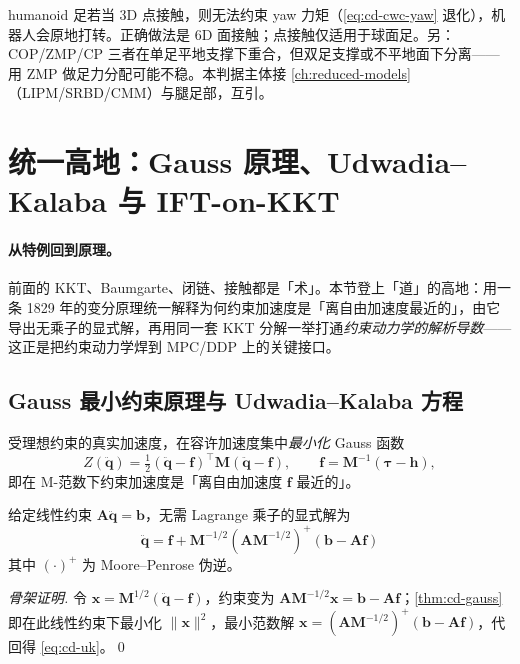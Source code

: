 \begin{pitfall}
humanoid 足若当 3D 点接触，则无法约束 yaw 力矩（\cref{eq:cd-cwc-yaw} 退化），机器人会原地打转。正确做法是 6D 面接触；点接触仅适用于球面足。另：COP/ZMP/CP 三者在单足平地支撑下重合，但双足支撑或不平地面下分离——用 ZMP 做足力分配可能不稳。本判据主体接 \cref{ch:reduced-models}（LIPM/SRBD/CMM）与腿足部，互引。
\end{pitfall}

\section{统一高地：Gauss 原理、Udwadia--Kalaba 与 IFT-on-KKT}
\label{sec:cd-gauss}

\paragraph{从特例回到原理。}
前面的 KKT、Baumgarte、闭链、接触都是「术」。本节登上「道」的高地：用一条 1829 年的变分原理统一解释为何约束加速度是「离自由加速度最近的」，由它导出无乘子的显式解，再用同一套 KKT 分解一举打通\emph{约束动力学的解析导数}——这正是把约束动力学焊到 MPC/DDP 上的关键接口。

\subsection{Gauss 最小约束原理与 Udwadia--Kalaba 方程}
\begin{theorem}\label{thm:cd-gauss}
受理想约束的真实加速度，在容许加速度集中\emph{最小化} Gauss 函数
\begin{equation}
  Z(\ddot{\mathbf q})=\tfrac12(\ddot{\mathbf q}-\mathbf f)^\top\mathbf M(\ddot{\mathbf q}-\mathbf f),\qquad \mathbf f=\mathbf M^{-1}(\boldsymbol\tau-\mathbf h),
  \label{eq:cd-gauss}
\end{equation}
即在 M-范数下约束加速度是「离自由加速度 $\mathbf f$ 最近的」。
\end{theorem}

\begin{theorem}\label{thm:cd-uk}
给定线性约束 $\mathbf A\ddot{\mathbf q}=\mathbf b$，无需 Lagrange 乘子的显式解为
\begin{equation}
  \boxed{\;\ddot{\mathbf q}=\mathbf f+\mathbf M^{-1/2}(\mathbf A\mathbf M^{-1/2})^+(\mathbf b-\mathbf A\mathbf f)\;}
  \label{eq:cd-uk}
\end{equation}
其中 $(\cdot)^+$ 为 Moore--Penrose 伪逆。
\end{theorem}
\begin{proof}[骨架证明]
令 $\mathbf x=\mathbf M^{1/2}(\ddot{\mathbf q}-\mathbf f)$，约束变为 $\mathbf A\mathbf M^{-1/2}\mathbf x=\mathbf b-\mathbf A\mathbf f$；\cref{thm:cd-gauss} 即在此线性约束下最小化 $\|\mathbf x\|^2$，最小范数解 $\mathbf x=(\mathbf A\mathbf M^{-1/2})^+(\mathbf b-\mathbf A\mathbf f)$，代回得 \cref{eq:cd-uk}。\qed
\end{proof}

